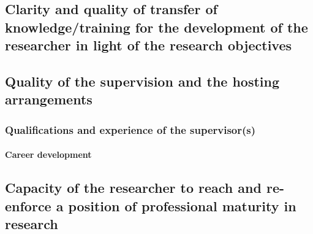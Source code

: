 \subsection{Clarity and quality of transfer of knowledge/training for the development of the researcher in light of the research objectives}
\label{sec:transfer}


\subsection{Quality of the supervision and the hosting arrangements}
\label{sec:supervision}

\subsubsection*{Qualifications and experience of the supervisor(s)}


\paragraph{Career development}

\subsection{Capacity of the researcher to reach and re-enforce a position of professional maturity in research}
\label{sec:maturity}
